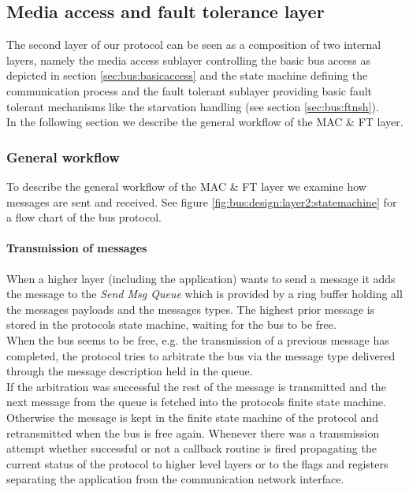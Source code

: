 \subsection{Media access and fault tolerance layer}
\label{sec:bus:design:layer2}

The second layer of our protocol can be seen as a composition of two internal layers, 
namely the media access sublayer controlling the basic bus access as depicted in section 
\ref{sec:bus:basicaccess}  and the state machine defining 
the communication process and the fault tolerant sublayer providing basic fault 
tolerant mechanisms like the starvation handling (see section \ref{sec:bus:ftnsh}).\\

In the following section we describe the general workflow of the MAC \& FT layer.

\subsubsection{General workflow}
To describe the general workflow of the MAC \& FT layer we examine how messages are sent and received. 
See figure \ref{fig:bus:design:layer2:statemachine} for a flow chart of the bus protocol.\\

\paragraph{Transmission of messages}
When a higher layer (including the application) wants to send a message it adds the message to the \textit{Send Msg Queue} which is provided
by a ring buffer holding all the messages payloads and the messages types. The highest prior message is stored in the protocols state machine, waiting for the bus to be free.\\

When the bus seems to be free, e.g. the transmission of a previous message has completed, the protocol tries to arbitrate the bus via the message type delivered through the message description held in the queue.\\

If the arbitration was successful the rest of the message is transmitted and the next message from the queue is fetched into the protocols finite state machine. Otherwise the message is kept in the finite state machine of the protocol and retransmitted when the bus is free again.
Whenever there was a transmission attempt whether successful or not a callback routine is fired propagating the current status of the protocol to higher level layers or to the flags and registers separating the application from the communication network interface.\\

